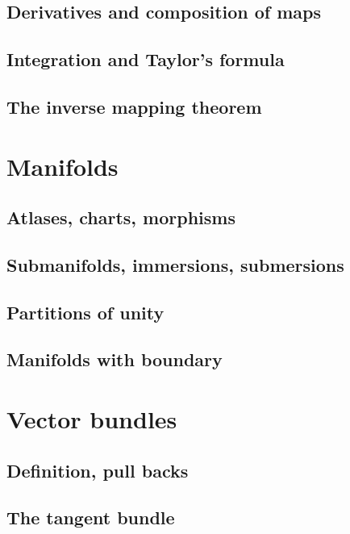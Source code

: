\documentclass[a4paper]{article}
\begin{document}
\subsection{Derivatives and composition of maps}

\subsection{Integration and Taylor's formula}

\subsection{The inverse mapping theorem}

\section{Manifolds}

\subsection{Atlases, charts, morphisms}

\subsection{Submanifolds, immersions, submersions}

\subsection{Partitions of unity}

\subsection{Manifolds with boundary}

\section{Vector bundles}

\subsection{Definition, pull backs}

\subsection{The tangent bundle}
\end{document}
